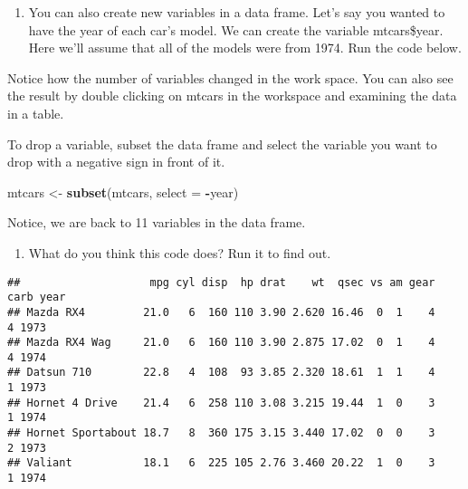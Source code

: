 \documentclass[]{article}
\newenvironment{Shaded}{\begin{snugshade}}{\end{snugshade}}
\newcommand{\KeywordTok}[1]{\textcolor[rgb]{0.13,0.29,0.53}{\textbf{#1}}}
\newcommand{\DataTypeTok}[1]{\textcolor[rgb]{0.13,0.29,0.53}{#1}}
\newcommand{\DecValTok}[1]{\textcolor[rgb]{0.00,0.00,0.81}{#1}}
\newcommand{\StringTok}[1]{\textcolor[rgb]{0.31,0.60,0.02}{#1}}
\newcommand{\OperatorTok}[1]{\textcolor[rgb]{0.81,0.36,0.00}{\textbf{#1}}}
\newcommand{\NormalTok}[1]{#1}
\providecommand{\tightlist}{%
  \setlength{\itemsep}{0pt}\setlength{\parskip}{0pt}}
\begin{document}
\begin{enumerate}
\def\labelenumi{\arabic{enumi}.}
\setcounter{enumi}{7}
\tightlist
\item
  You can also create new variables in a data frame. Let's say you
  wanted to have the year of each car's model. We can create the
  variable mtcars\$year. Here we'll assume that all of the models were
  from 1974. Run the code below.
\end{enumerate}

\begin{Shaded}
\end{Shaded}

Notice how the number of variables changed in the work space. You can
also see the result by double clicking on mtcars in the workspace and
examining the data in a table.

To drop a variable, subset the data frame and select the variable you
want to drop with a negative sign in front of it.

\begin{Shaded}
\begin{Highlighting}[]
\NormalTok{mtcars <-}\StringTok{ }\KeywordTok{subset}\NormalTok{(mtcars, }\DataTypeTok{select =} \OperatorTok{-}\NormalTok{year)}
\end{Highlighting}
\end{Shaded}

Notice, we are back to 11 variables in the data frame.

\begin{enumerate}
\def\labelenumi{\arabic{enumi}.}
\setcounter{enumi}{8}
\tightlist
\item
  What do you think this code does? Run it to find out.
\end{enumerate}

\begin{Shaded}
\end{Shaded}

\begin{verbatim}
##                    mpg cyl disp  hp drat    wt  qsec vs am gear carb year
## Mazda RX4         21.0   6  160 110 3.90 2.620 16.46  0  1    4    4 1973
## Mazda RX4 Wag     21.0   6  160 110 3.90 2.875 17.02  0  1    4    4 1974
## Datsun 710        22.8   4  108  93 3.85 2.320 18.61  1  1    4    1 1973
## Hornet 4 Drive    21.4   6  258 110 3.08 3.215 19.44  1  0    3    1 1974
## Hornet Sportabout 18.7   8  360 175 3.15 3.440 17.02  0  0    3    2 1973
## Valiant           18.1   6  225 105 2.76 3.460 20.22  1  0    3    1 1974
\end{verbatim}
\end{document}
